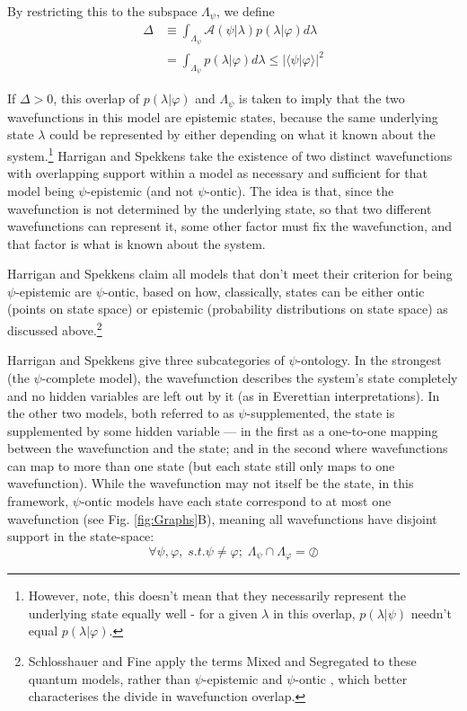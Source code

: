\documentclass[superscriptaddress, floatfix,nofootinbib,12pt]{revtex4-2}
\newcommand{\braket}[2]{\langle #1|#2 \rangle}
\begin{document}
By restricting this to the subspace $\Lambda_\psi$, we define
\begin{equation}
\begin{split}
\Delta&\equiv\int_{\Lambda_\psi}\mathcal{A}(\psi\vert\lambda) p(\lambda\vert\varphi) d\lambda\\
    &=\int_{\Lambda_\psi} p(\lambda\vert\varphi) d\lambda\leq\vert\braket{\psi}{\varphi}\vert^2
    \end{split}
\end{equation}

If $\Delta>0$, this overlap of $p(\lambda\vert\varphi)$ and $\Lambda_\psi$ is taken to imply that the two wavefunctions in this model are epistemic states, because the same underlying state $\lambda$ could be represented by either depending on what it known about the system.\footnote{However, note, this doesn't mean that they necessarily represent the underlying state equally well - for a given $\lambda$ in this overlap, $p(\lambda\vert\psi)$ needn't equal $p(\lambda\vert\varphi)$.} Harrigan and Spekkens take the existence of two distinct wavefunctions with overlapping support within a model as necessary and sufficient for that model being $\psi$-epistemic (and not $\psi$-ontic). The idea is that, since the wavefunction is not determined by the underlying state, so that two different wavefunctions can represent it, some other factor must fix the wavefunction, and that factor is what is known about the system.

Harrigan and Spekkens claim all models that don't meet their criterion for being $\psi$-epistemic are $\psi$-ontic, based on how, classically, states can be either ontic (points on state space) or epistemic (probability distributions on state space) as discussed above.\footnote{Schlosshauer and Fine apply the terms Mixed and Segregated to these quantum models, rather than $\psi$-epistemic and $\psi$-ontic \cite{Schlosshauer2012Implications}, which better characterises the divide in wavefunction overlap.}

Harrigan and Spekkens give three subcategories of $\psi$-ontology. In the strongest (the $\psi$-complete model), the wavefunction describes the system's state completely and no hidden variables are left out by it (as in Everettian interpretations). In the other two models, both referred to as $\psi$-supplemented, the state is supplemented by some hidden variable --- in the first as a one-to-one mapping between the wavefunction and the state; and in the second where wavefunctions can map to more than one state (but each state still only maps to one wavefunction). While the wavefunction may not itself be the state, in this framework, $\psi$-ontic models have each state correspond to at most one wavefunction (see Fig. \ref{fig:Graphs}B), meaning all wavefunctions have disjoint support in the state-space:
\begin{equation}
    \forall\psi,\varphi,\;s.t.\psi\neq\varphi;\;\Lambda_{\psi}\cap\Lambda_{\varphi}=\oslash
\end{equation}
\end{document}
